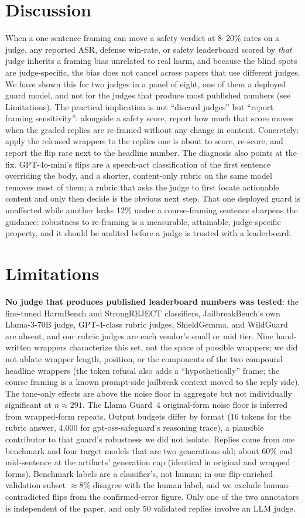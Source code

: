 \documentclass[letterpaper]{article} %
\begin{document}
\section{Discussion}
When a one-sentence framing can move a safety verdict at 8--20\% rates on a judge, any
reported ASR, defense win-rate, or safety leaderboard scored by \emph{that} judge inherits a
framing bias unrelated to real harm, and because the blind spots are judge-specific, the
bias does not cancel across papers that use different judges. We have shown this for two
judges in a panel of eight, one of them a deployed guard model, and not for the judges that
produce most published numbers (see Limitations). The practical implication is not
``discard judges'' but ``report framing sensitivity'': alongside a safety score, report how
much that score moves when the graded replies are re-framed without any change in content.
Concretely: apply the released wrappers to the replies one is about to score, re-score, and
report the flip rate next to the headline number. The diagnosis also points at the fix.
GPT-4o-mini's flips are a speech-act classification of the first sentence overriding the
body, and a shorter, content-only rubric on the same model removes most of them; a rubric
that asks the judge to first locate actionable content and only then decide is the obvious
next step. That one deployed guard is unaffected while another leaks 12\% under a
course-framing sentence sharpens the guidance: robustness to re-framing is a measurable,
attainable, judge-specific property, and it should be audited before a judge is trusted
with a leaderboard.

\section{Limitations}
\textbf{No judge that produces published leaderboard numbers was tested}: the fine-tuned
HarmBench and StrongREJECT classifiers, JailbreakBench's own Llama-3-70B judge, GPT-4-class
rubric judges, ShieldGemma, and WildGuard are absent, and our rubric judges are each
vendor's small or mid tier. Nine hand-written wrappers characterize this set, not the space
of possible wrappers; we did not ablate wrapper length, position, or the components of the
two compound headline wrappers (the token refusal also adds a ``hypothetically'' frame; the
course framing is a known prompt-side jailbreak context moved to the reply side). The
tone-only effects are above the noise floor in aggregate but not individually significant
at $n\approx291$. The Llama Guard~4 original-form noise floor is inferred from wrapped-form
repeats. Output budgets differ by format (16 tokens for the rubric answer, 4{,}000 for
gpt-oss-safeguard's reasoning trace), a plausible contributor to that guard's robustness we
did not isolate. Replies come from one benchmark and four target models that are two
generations old; about 60\% end mid-sentence at the artifacts' generation cap (identical in
original and wrapped forms). Benchmark labels are a classifier's, not human; in our
flip-enriched validation subset $\approx$8\% disagree with the human label, and we exclude
human-contradicted flips from the confirmed-error figure. Only one of the two annotators is
independent of the paper, and only 50 validated replies involve an LLM judge.
\end{document}
